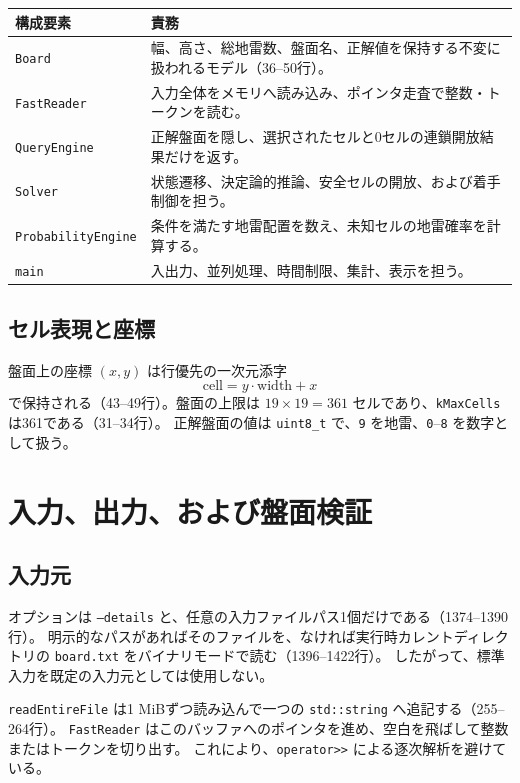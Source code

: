 \documentclass[uplatex,dvipdfmx,11pt]{jsarticle}
\newcommand{\code}[1]{\texttt{#1}}
\begin{document}
\begin{center}
\begin{tabular}{p{34mm}p{96mm}}
\toprule
構成要素 & 責務 \\
\midrule
\code{Board} & 幅、高さ、総地雷数、盤面名、正解値を保持する不変に扱われるモデル（36--50行）。\\
\code{FastReader} & 入力全体をメモリへ読み込み、ポインタ走査で整数・トークンを読む。\\
\code{QueryEngine} & 正解盤面を隠し、選択されたセルと0セルの連鎖開放結果だけを返す。\\
\code{Solver} & 状態遷移、決定論的推論、安全セルの開放、および着手制御を担う。\\
\code{ProbabilityEngine} & 条件を満たす地雷配置を数え、未知セルの地雷確率を計算する。\\
\code{main} & 入出力、並列処理、時間制限、集計、表示を担う。\\
\bottomrule
\end{tabular}
\end{center}

\subsection{セル表現と座標}
盤面上の座標 $(x,y)$ は行優先の一次元添字
\[
  \mathrm{cell}=y\cdot\mathrm{width}+x
\]
で保持される（43--49行）。盤面の上限は $19\times19=361$ セルであり、\code{kMaxCells} は361である（31--34行）。
正解盤面の値は \code{uint8\_t} で、\code{9} を地雷、\code{0}--\code{8} を数字として扱う。

\section{入力、出力、および盤面検証}

\subsection{入力元}
オプションは \code{--details} と、任意の入力ファイルパス1個だけである（1374--1390行）。
明示的なパスがあればそのファイルを、なければ実行時カレントディレクトリの \code{board.txt} をバイナリモードで読む（1396--1422行）。
したがって、標準入力を既定の入力元としては使用しない。

\code{readEntireFile} は1 MiBずつ読み込んで一つの \code{std::string} へ追記する（255--264行）。
\code{FastReader} はこのバッファへのポインタを進め、空白を飛ばして整数またはトークンを切り出す。
これにより、\code{operator>>} による逐次解析を避けている。
\end{document}
